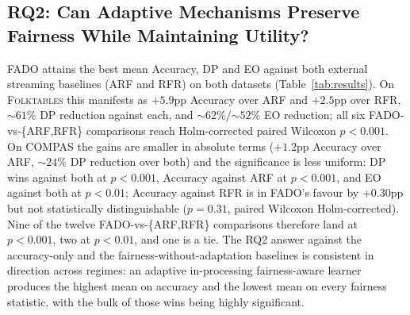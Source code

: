 \documentclass[sigconf,anonymous,review]{acmart}
\begin{document}
\subsection{RQ2: Can Adaptive Mechanisms Preserve Fairness While Maintaining Utility?}
\label{sec:results:rq2}
\textsc{FADO} attains the best mean Accuracy, DP and EO against both external streaming baselines (\textsc{ARF} and \textsc{RFR}) on both datasets
(Table~\ref{tab:results}). On \textsc{Folktables} this manifests as $+5.9$pp Accuracy over \textsc{ARF} and $+2.5$pp over \textsc{RFR}, $\sim 61\%$ DP
reduction against each, and $\sim 62\%$/$\sim 52\%$ EO reduction; all six FADO-vs-\{\textsc{ARF},\textsc{RFR}\} comparisons reach Holm-corrected paired
Wilcoxon $p<0.001$. On \textsc{COMPAS} the gains are smaller in absolute terms ($+1.2$pp Accuracy over \textsc{ARF}, $\sim 24\%$ DP reduction over both)
and the significance is less uniform: DP wins against both at $p<0.001$, Accuracy against \textsc{ARF} at $p<0.001$, and EO against both at $p<0.01$;
Accuracy against \textsc{RFR} is in \textsc{FADO}'s favour by $+0.30$pp but not statistically distinguishable ($p=0.31$, paired Wilcoxon
Holm-corrected). Nine of the twelve FADO-vs-\{\textsc{ARF},\textsc{RFR}\} comparisons therefore land at $p<0.001$, two at $p<0.01$, and one is a tie. The
RQ2 answer against the accuracy-only and the fairness-without-adaptation baselines is consistent in direction across regimes: an adaptive in-processing
fairness-aware learner produces the highest mean on accuracy and the lowest mean on every fairness statistic, with the bulk of those wins being highly
significant.
\end{document}
